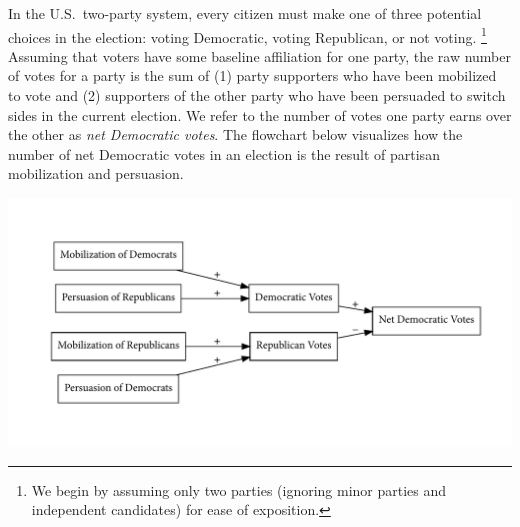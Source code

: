 \documentclass[12pt
               ,final
               ]{article}
\begin{document}
In the U.S.\ two-party system, every citizen must make one of three potential choices in the election: voting Democratic, voting Republican, or not voting.%
 \footnote{We begin by assuming only two parties (ignoring minor parties and independent candidates) for ease of exposition.} 
Assuming that voters have some baseline affiliation for one party, the raw number of votes for a party is the sum of (1) party supporters who have been mobilized to vote and (2) supporters of the other party who have been persuaded to switch sides in the current election. We refer to the number of votes one party earns over the other as \emph{net Democratic votes}. The flowchart below visualizes how the number of net Democratic votes in an election is the result of partisan mobilization and persuasion.
%

\begin{center}
  \includegraphics[width = \textwidth]{diagrams/net-votes.pdf}
\end{center}

\end{document}
